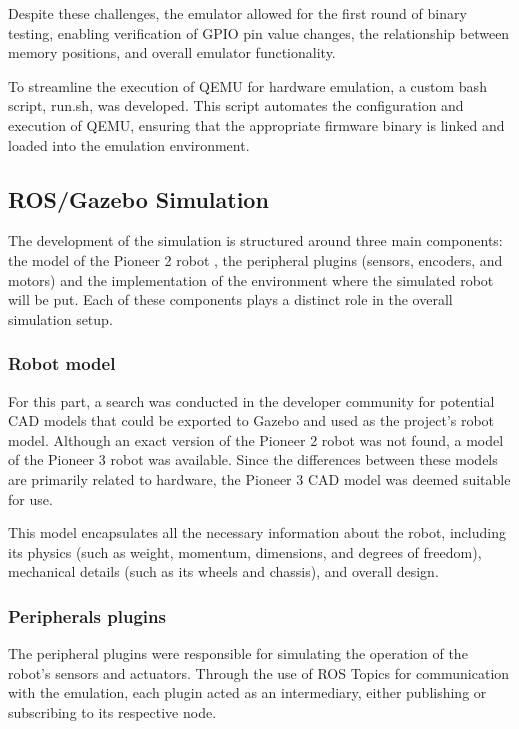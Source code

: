 \documentclass[../../monografia.tex]{subfiles}
\begin{document}
Despite these challenges, the emulator allowed for the first round of binary testing, enabling verification of GPIO pin value changes, the relationship between memory positions, and overall emulator functionality.

To streamline the execution of QEMU for hardware emulation, a custom bash script, run.sh, was developed. This script automates the configuration and execution of QEMU, ensuring that the appropriate firmware binary is linked and loaded into the emulation environment.

\subsection{ROS/Gazebo Simulation}

The development of the simulation is structured around three main components: the model of the Pioneer 2 robot \cite{pioneer2dx_2024}, the peripheral plugins (sensors, encoders, and motors) and the implementation of the environment where the simulated robot will be put. Each of these components plays a distinct role in the overall simulation setup.

\subsubsection{Robot model}

For this part, a search was conducted in the developer community for potential CAD models \cite{CAD_23} that could be exported to Gazebo \cite{gazebo_21} and used as the project's robot model. Although an exact version of the Pioneer 2 robot was not found, a model of the Pioneer 3 robot was available. Since the differences between these models are primarily related to hardware, the Pioneer 3 \cite{Pioneer3_23} CAD model was deemed suitable for use.

This model \cite{Pioneer2_CAD_23} encapsulates all the necessary information about the robot, including its physics (such as weight, momentum, dimensions, and degrees of freedom), mechanical details (such as its wheels and chassis), and overall design.

\subsubsection{Peripherals plugins}

The peripheral plugins were responsible for simulating the operation of the robot's sensors and actuators. Through the use of ROS Topics \cite{ROS_Topics_23} for communication with the emulation, each plugin acted as an intermediary, either publishing or subscribing to its respective node.
\end{document}
